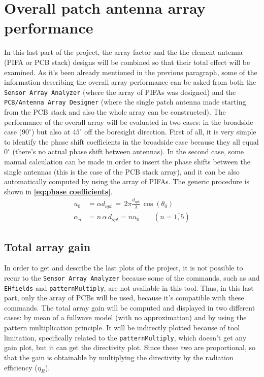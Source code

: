 \documentclass[12pt,a4paper]{article}
\begin{document}
{\section*{\selectfont\color{Turquoise}Overall patch antenna array performance}
In this last part of the project, the array factor and the the element antenna (PIFA or PCB stack) designs will be combined so that their total effect will be examined. As it's been already mentioned in the previous paragraph, some of the information describing the overall array performance can be asked from both the \texttt{\color{Mahogany}Sensor Array Analyzer} (where the array of PIFAs was designed) and the \texttt{\color{Mahogany}PCB/Antenna Array Designer} (where the single patch antenna made starting from the PCB stack and also the whole array can be constructed). The performance of the overall array will be evaluated in two cases: in the broadside case ($90^\circ$) but also at $45^\circ$ off the boresight direction. First of all, it is very simple to identify the phase shift coefficients in the broadside case because they all equal $0^\circ$ (there's no actual phase shift between antennas). In the second case, some manual calculation can be made in order to insert the phase shifts between the single antennas (this is the case of the PCB stack array), and it can be also automatically computed by using the array of PIFAs. The generic procedure is shown in \textbf{\cref{eq:phase coefficients}}. 
\begin{equation}
	\begin{aligned}
		u_0&=\alpha d_{opt}\,=\,2\pi\frac{d_{opt}}{\lambda}\,\cos(\theta_0)\\
		\alpha_n&=n\,\alpha\,d_{opt}=nu_0\qquad \left(n=\overline{1,5}\right)
		\label{eq:phase coefficients}
	\end{aligned}
\end{equation}
\subsection*{\selectfont\color{Turquoise}Total array gain}
In order to get and describe the last plots of the project, it is not possible to recur to the \texttt{\color{Mahogany}Sensor Array Analyzer} because some of the commands, such as  and \texttt{\color{Turquoise}EHfields} and \texttt{\color{Turquoise}patternMultiply}, are not available in this tool. Thus, in this last part, only the array of PCBs will be used, because it's compatible with these commands. The total array gain will be computed and displayed in two different cases: by mean of a fullwave model (with no approximation) and by using the pattern multiplication principle. It will be indirectly plotted because of tool limitation, specifically related to the \texttt{\color{Turquoise}patternMultiply}, which doesn't get any gain plot, but it can get the directivity plot. Since these two are proportional, so that the gain is obtainable by multiplying the directivity by the radiation efficiency ($\eta_R$). 






\newpage 

\printbibliography

}
\end{document}
